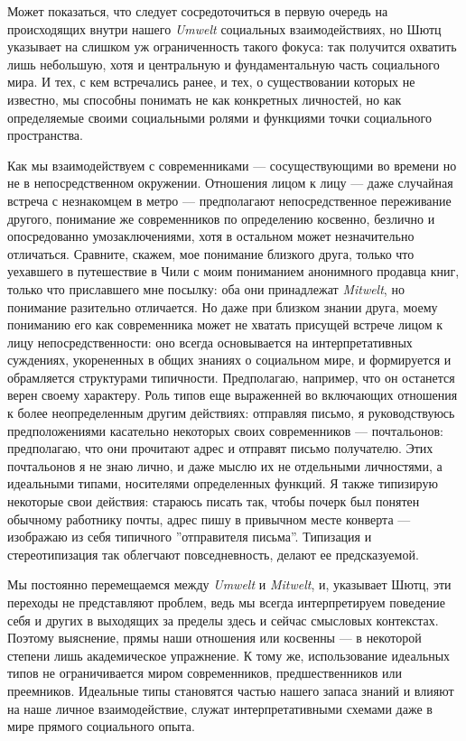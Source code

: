 \documentclass[11pt]{book}
\begin{document}
Может показаться, что следует сосредоточиться в первую очередь на происходящих внутри нашего \textit{Umwelt} социальных взаимодействиях, но Шютц указывает на слишком уж ограниченность такого фокуса: так получится охватить лишь небольшую, хотя и центральную и фундаментальную часть социального мира. И тех, с кем встречались ранее, и тех, о существовании которых не известно, мы способны понимать не как конкретных личностей, но как определяемые своими социальными ролями и функциями точки социального пространства.

Как мы взаимодействуем с современниками --- сосуществующими во времени но не в непосредственном окружении. Отношения лицом к лицу --- даже случайная встреча с незнакомцем в метро --- предполагают непосредственное переживание другого, понимание же современников по определению косвенно, безлично и опосредованно умозаключениями, хотя в остальном может незначительно отличаться. Сравните, скажем, мое понимание близкого друга, только что уехавшего в путешествие в Чили с моим пониманием анонимного продавца книг, только что приславшего мне посылку: оба они принадлежат \textit{Mitwelt}, но понимание разительно отличается. Но даже при близком знании друга, моему пониманию его как современника может не хватать присущей встрече лицом к лицу непосредственности: оно всегда основывается на интерпретативных суждениях, укорененных в общих знаниях о социальном мире, и формируется и обрамляется структурами типичности. Предполагаю, например, что он останется верен своему характеру. Роль типов еще выраженней во включающих отношения к более неопределенным другим действиях: отправляя письмо, я руководствуюсь предположениями касательно некоторых своих современников --- почтальонов: предполагаю, что они прочитают адрес и отправят письмо получателю. Этих почтальонов я не знаю лично, и даже мыслю их не отдельными личностями, а идеальными типами, носителями определенных функций. Я также типизирую некоторые свои действия: стараюсь писать так, чтобы почерк был понятен обычному работнику почты, адрес пишу в привычном месте конверта --- изображаю из себя типичного ''отправителя письма''. Типизация и стереотипизация так облегчают повседневность, делают ее предсказуемой.

Мы постоянно перемещаемся между \textit{Umwelt} и \textit{Mitwelt}, и, указывает Шютц, эти переходы не представляют проблем, ведь мы всегда интерпретируем поведение себя и других в выходящих за пределы здесь и сейчас смысловых контекстах. Поэтому выяснение, прямы наши отношения или косвенны --- в некоторой степени лишь академическое упражнение. К тому же, использование идеальных типов не ограничивается миром современников, предшественников или преемников. Идеальные типы становятся частью нашего запаса знаний и влияют на наше личное взаимодействие, служат интерпретативными схемами даже в мире прямого социального опыта.
\end{document}
